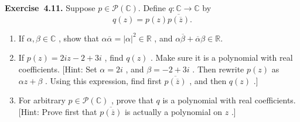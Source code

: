 \documentclass[11pt]{article}
\newcommand{\ProblemAnnounce}{\noindent}
\newcommand{\Exercise}[1]{\textbf{Exercise~#1.}\;}
\begin{document}
\begin{problemBox}
\ProblemAnnounce
\Exercise{4.11}
Suppose \(p\in \mathcal{P}(\mathbb{C})\). Define \(q:\mathbb{C}\longrightarrow \mathbb{C}\) by
\[
q(z) = p(z)\overline{p(\overline{z})}.
\]
\begin{enumerate}
  \item[(a)] If \(\alpha ,\beta \in \mathbb{C}\) , show that \(\alpha \overline{\alpha} = |\alpha |^{2}\in \mathbb{R}\) , and \(\alpha \overline{\beta} +\overline{\alpha}\beta \in \mathbb{R}\).
  \item[(b)] If \(p(z) = 2iz - 2 + 3i\) , find \(q(z)\) . Make sure it is a polynomial with real coefficients. [Hint: Set \(\alpha = 2i\) , and \(\beta = -2 + 3i\) . Then rewrite \(p(z)\) as \(\alpha z + \beta\) . Using this expression, find first \(\overline{p(\overline{z})}\) , and then \(q(z)\) .]
  \item[(c)] For arbitrary \(p\in \mathcal{P}(\mathbb{C})\) , prove that \(q\) is a polynomial with real coefficients. [Hint: Prove first that \(\overline{p(\overline{z})}\) is actually a polynomial on \(z\) .]
\end{enumerate}
\end{problemBox}
\end{document}
